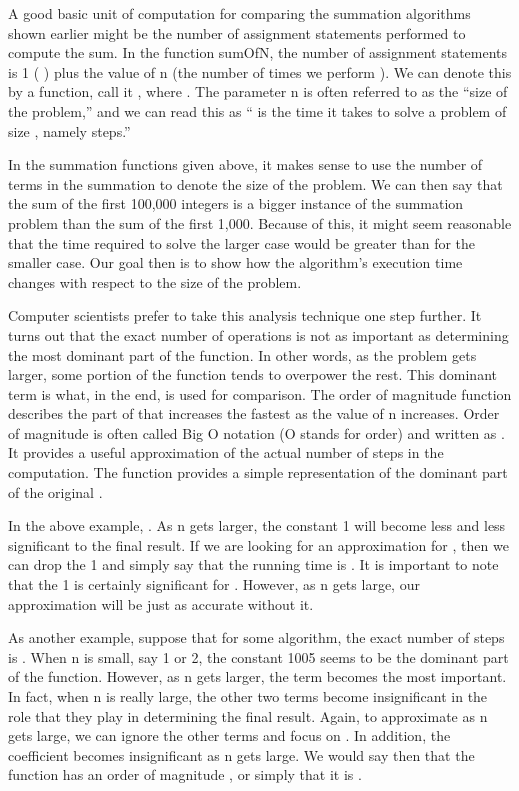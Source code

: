 A good basic unit of computation for comparing the summation algorithms shown earlier might be the number of assignment statements performed to compute the sum. In the function sumOfN, the number of assignment statements is 1 (
) plus the value of n (the number of times we perform ). We can denote this by a function, call it , where . The parameter n is often referred to as the “size of the problem,” and we can read this as “ is the time it takes to solve a problem of size , namely
steps.”

In the summation functions given above, it makes sense to use the number of terms in the summation to denote the size of the problem. We can then say that the sum of the first 100,000 integers is a bigger instance of the summation problem than the sum of the first 1,000. Because of this, it might seem reasonable that the time required to solve the larger case would be greater than for the smaller case. Our goal then is to show how the algorithm’s execution time changes with respect to the size of the problem.

Computer scientists prefer to take this analysis technique one step further. It turns out that the exact number of operations is not as important as determining the most dominant part of the
function. In other words, as the problem gets larger, some portion of the function tends to overpower the rest. This dominant term is what, in the end, is used for comparison. The order of magnitude function describes the part of that increases the fastest as the value of n increases. Order of magnitude is often called Big O notation (O stands for order) and written as . It provides a useful approximation of the actual number of steps in the computation. The function provides a simple representation of the dominant part of the original .

In the above example, . As n gets larger, the constant 1 will become less and less significant to the final result. If we are looking for an approximation for , then we can drop the 1 and simply say that the running time is . It is important to note that the 1 is certainly significant for .
However, as n gets large, our approximation will be just as accurate without it.

As another example, suppose that for some algorithm, the exact number of steps is .
When n is small, say 1 or 2, the constant 1005 seems to be the dominant part of the function. However, as n gets larger, the term becomes the most important. In fact, when n is really large, the other two terms become insignificant in the role that they play in determining the final result. Again, to approximate as n gets large, we can ignore the other terms and focus on . In addition, the coefficient becomes insignificant as n gets large. We would say then that the function has an order of magnitude , or simply that it is .

